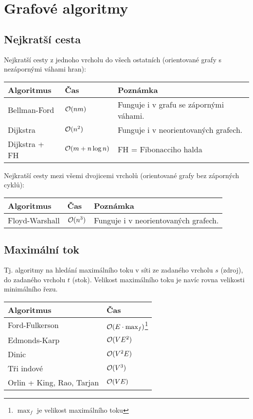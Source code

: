 \renewcommand{\arraystretch}{1.25}
\section{Grafové algoritmy}
\subsection{Nejkratší cesta}

Nejkratší cesty z jednoho vrcholu do všech ostatních (orientované grafy s
nezápornými váhami hran):

\begin{center}
\begin{tabular}{ l l p{8cm} }
	\hline
	\bf Algoritmus & \bf Čas & \bf Poznámka \\
	\hline
	Bellman-Ford & $\mathcal{O}(nm)$ & Funguje i v grafu se zápornými váhami. \\
	Dijkstra & $\mathcal{O}(n^2)$ & Funguje i v neorientovaných grafech. \\
	Dijkstra + FH & $\mathcal{O}(m + n\log n)$ & FH = Fibonacciho halda \\
	\hline
\end{tabular}
\end{center}

\noindent Nejkratší cesty mezi všemi dvojicemi vrcholů (orientované grafy bez záporných cyklů):

\begin{center}
\begin{tabular}{ l l p{8cm} }
	\hline
	\bf Algoritmus & \bf Čas & \bf Poznámka \\
	\hline
	Floyd-Warshall & $\mathcal{O}(n^3)$ & Funguje i v neorientovaných grafech. \\
	\hline
\end{tabular}
\end{center}

\subsection{Maximální tok}

Tj. algoritmy na hledání maximálního toku v síti ze zadaného vrcholu $s$
(zdroj), do zadaného vrcholu $t$ (stok). Velikost maximálního toku je navíc
rovna velikosti minimálního řezu.

\begin{center}
\begin{tabular}{ l l }
	\hline
	\bf Algoritmus & \bf Čas \\ 
	\hline
	Ford-Fulkerson & $\mathcal{O}(E\cdot \max_f)$\footnote{$\max_f$ je velikost maximálního toku} \\
    Edmonds-Karp & $\mathcal{O}(VE^2)$ \\
    Dinic & $\mathcal{O}(V^2E)$ \\
	Tři indové & $\mathcal{O}(V^3)$ \\
	Orlin + King, Rao, Tarjan & $\mathcal{O}(VE)$ \\ 
    \hline
\end{tabular}
\end{center}

